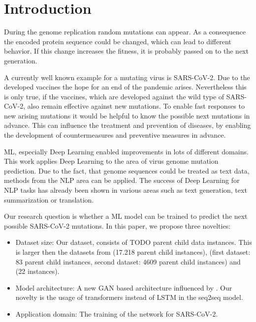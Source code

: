 \section{Introduction}  \label{introduction}


During the genome replication random mutations can appear. As a consequence the encoded protein sequence could be changed, which can lead to different behavior. If this change increases the fitness, it is probably passed on to the next generation. \cite{Berman2020}

A currently well known example for a mutating virus is \ac{SARS-CoV-2}. Due to the developed vaccines the hope for an end of the pandemic arises. Nevertheless this is only true, if the vaccines, which are developed against the wild type of \ac{SARS-CoV-2}, also remain effective against new mutations. To enable fast responses to new arising mutations it would be helpful to know the possible next mutations in advance. This can influence the treatment and prevention of diseases, by enabling the development of countermeasures and preventive measures in advance.

\ac{ML}, especially Deep Learning enabled improvements in lots of different domains. This work applies Deep Learning to the area of virus genome mutation prediction. Due to the fact, that genome sequences could be treated as text data, methods from the \ac{NLP} area can be applied. The success of Deep Learning for \ac{NLP} tasks has already been shown in various areas such as text generation, text summarization or translation. \cite{Berman2020}


Our research question is whether a \ac{ML} model can be trained to predict the next possible \ac{SARS-CoV-2} mutations. In this paper, we propose three novelties:
\begin{itemize}
	\item Dataset size: Our dataset, consists of TODO parent child data instances. This is larger then the datasets from \cite{Berman2020} (17.218 parent child instances), \cite{Mohamed2021} (first dataset: 83 parent child instances, second dataset: 4609 parent child instances) and \cite{Salama2016} (22 instances).
	\item Model architecture: A new \ac{GAN} based architecture influenced by \cite{Berman2020}. Our novelty is the usage of transformers instead of \ac{LSTM} in the seq2seq model.
	\item Application domain: The training of the network for \ac{SARS-CoV-2}.
\end{itemize}

\newpage
